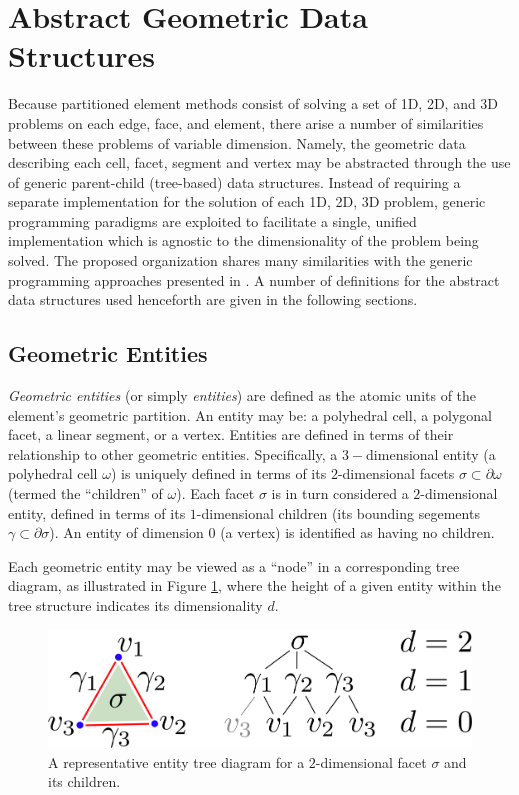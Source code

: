 \section{Abstract Geometric Data Structures}

	Because partitioned element methods consist of solving a set of 1D, 2D, and 3D problems on each edge, face, and element, there arise a number of similarities between these problems of variable dimension. Namely, the geometric data describing each cell, facet, segment and vertex may be abstracted through the use of generic parent-child (tree-based) data structures. Instead of requiring a separate implementation for the solution of each 1D, 2D, 3D problem, generic programming paradigms are exploited to facilitate a single, unified implementation which is agnostic to the dimensionality of the problem being solved. The proposed organization shares many similarities with the generic programming approaches presented in \cite{Cicuttin:17}. A number of definitions for the abstract data structures used henceforth are given in the following sections.
	
\subsection*{Geometric Entities}

	\textit{Geometric entities} (or simply \textit{entities}) are defined as the atomic units of the element's geometric partition. An entity may be: a polyhedral cell, a polygonal facet, a linear segment, or a vertex. Entities are defined in terms of their relationship to other geometric entities. Specifically, a $3-$dimensional entity (a polyhedral cell $\omega$) is uniquely defined in terms of its $2$-dimensional facets $\sigma \subset \partial \omega$ (termed the ``children'' of $\omega$). Each facet $\sigma$ is in turn considered a $2$-dimensional entity, defined in terms of its $1$-dimensional children (its bounding segements $\gamma \subset \partial \sigma$). An entity of dimension $0$ (a vertex) is identified as having no children.
	
	Each geometric entity may be viewed as a ``node'' in a corresponding tree diagram, as illustrated in Figure \ref{fig:entity_tree}, where the height of a given entity within the tree structure indicates its dimensionality $d$.
	\begin{figure} [!ht]
		\centering
		\includegraphics[width = 5.0in]{figures/entity_tree.pdf}
		\caption{A representative entity tree diagram for a $2$-dimensional facet $\sigma$ and its children.}
		\label{fig:entity_tree}
	\end{figure}
	
